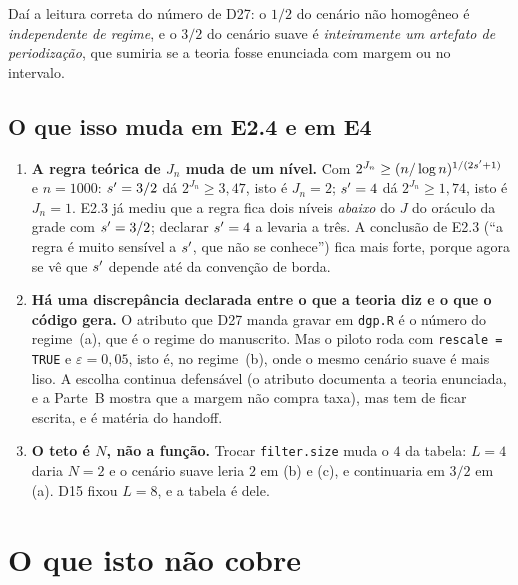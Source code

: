 \documentclass[11pt,a4paper]{article}
\newcommand{\eps}{\varepsilon}
\begin{document}
Daí a leitura correta do número de D27: o $1/2$ do cenário não homogêneo é
\emph{independente de regime}, e o $3/2$ do cenário suave é
\emph{inteiramente um artefato de periodização}, que sumiria se a teoria
fosse enunciada com margem ou no intervalo.

\subsection*{O que isso muda em E2.4 e em E4}

\begin{enumerate}[label=\textup{(\alph*)}, leftmargin=*]
  \item \textbf{A regra teórica de $J_{n}$ muda de um nível.} Com
    $2^{J_{n}} \ge (n/\log n)^{1/(2s'+1)}$ e $n = 1000$: $s' = 3/2$ dá
    $2^{J_{n}}\ge 3{,}47$, isto é $J_{n} = 2$; $s' = 4$ dá
    $2^{J_{n}}\ge 1{,}74$, isto é $J_{n} = 1$. E2.3 já mediu que a regra fica
    dois níveis \emph{abaixo} do $J$ do oráculo da grade com $s' = 3/2$;
    declarar $s' = 4$ a levaria a três. A conclusão de E2.3 (``a regra é
    muito sensível a $s'$, que não se conhece'') fica mais forte, porque
    agora se vê que $s'$ depende até da convenção de borda.
  \item \textbf{Há uma discrepância declarada entre o que a teoria diz e o
    que o código gera.} O atributo que D27 manda gravar em \texttt{dgp.R} é o
    número do regime~(a), que é o regime do manuscrito. Mas o piloto roda com
    \texttt{rescale = TRUE} e $\eps = 0{,}05$, isto é, no regime~(b), onde o
    mesmo cenário suave é mais liso. A escolha continua defensável (o atributo
    documenta a teoria enunciada, e a Parte~B mostra que a margem não compra
    taxa), mas tem de ficar escrita, e é matéria do handoff.
  \item \textbf{O teto é $N$, não a função.} Trocar \texttt{filter.size}
    muda o $4$ da tabela: $L = 4$ daria $N = 2$ e o cenário suave leria $2$ em
    (b) e (c), e continuaria em $3/2$ em (a). D15 fixou $L = 8$, e a tabela é
    dele.
\end{enumerate}

\section{O que isto não cobre}
\end{document}
